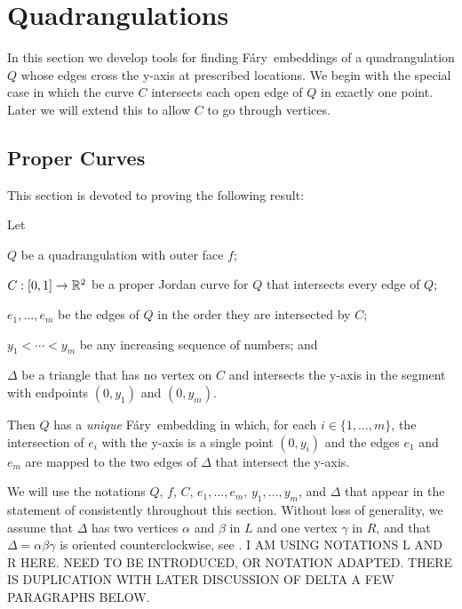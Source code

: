\documentclass{patmorin}
\newcommand{\Fary}{Fáry}
\begin{document}
\section{Quadrangulations}

In this section we develop tools for finding \Fary\ embeddings of
a quadrangulation $Q$ whose edges cross the y-axis at prescribed
locations. We begin with the special case in which the curve $C$
intersects each open edge of $Q$ in exactly one point.
Later we will extend this to allow $C$ to go through vertices.

\subsection{Proper Curves}

This section is devoted to proving the following result:

\begin{thm}
    Let
    \begin{compactitem}
    \item $Q$ be a quadrangulation with outer face $f$; 
    \item $C:[0,1]\to\mathbb{R}^2$ be a proper Jordan curve for $Q$
     that intersects every edge of $Q$;
    \item $e_1,\ldots,e_m$ be the edges of $Q$ in the
    order they are intersected by $C$; 
    \item $y_1<\cdots<y_m$
    be any increasing sequence of numbers; and
    \item $\Delta$ be a triangle that has no vertex on $C$ and intersects the y-axis
     in the segment with endpoints $(0,y_1)$ and $(0,y_m)$.
    \end{compactitem}
    Then $Q$ has a 
\emph{unique}
\Fary\ embedding in which, for each
    $i\in\{1,\ldots,m\}$, the intersection of $e_i$ with the y-axis is
    a single point $(0,y_i)$ and the edges $e_1$ and $e_m$ are mapped
    to the two edges of $\Delta$ that intersect the y-axis.
\end{thm}

We will use the notations $Q$, $f$, $C$, $e_1,\ldots,e_m$,
$y_1,\ldots,y_m$, and $\Delta$ that appear in the statement of
 consistently throughout this section.
Without loss of generality, we assume that  $\Delta$ %
 has two
vertices $\alpha$
and $\beta$
 in $L$ and one vertex $\gamma$ in $R$,
and that   $\Delta=\alpha\beta\gamma$ is oriented counterclockwise,
see .
I AM USING NOTATIONS L AND R HERE. NEED TO BE INTRODUCED, OR NOTATION ADAPTED.
THERE IS DUPLICATION WITH LATER DISCUSSION OF DELTA A FEW PARAGRAPHS BELOW.
\end{document}
